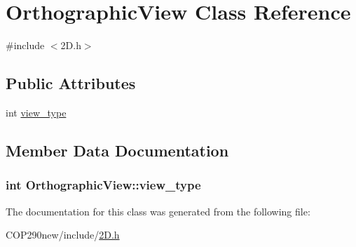 \hypertarget{class_orthographic_view}{}\section{Orthographic\+View Class Reference}
\label{class_orthographic_view}


{\ttfamily \#include $<$2\+D.\+h$>$}

\subsection*{Public Attributes}
\begin{DoxyCompactItemize}
\item 
int \hyperlink{class_orthographic_view_ae9f5b34d51d46495fd507dfa8f0c352b}{view\+\_\+type}
\end{DoxyCompactItemize}


\subsection{Member Data Documentation}
\subsubsection[{\texorpdfstring{view\+\_\+type}{view_type}}]{\setlength{\rightskip}{0pt plus 5cm}int Orthographic\+View\+::view\+\_\+type}\hypertarget{class_orthographic_view_ae9f5b34d51d46495fd507dfa8f0c352b}{}\label{class_orthographic_view_ae9f5b34d51d46495fd507dfa8f0c352b}


The documentation for this class was generated from the following file\+:\begin{DoxyCompactItemize}
\item 
C\+O\+P290new/include/\hyperlink{2_d_8h}{2\+D.\+h}\end{DoxyCompactItemize}
